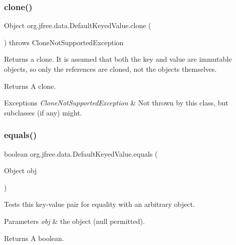 \subsubsection{\texorpdfstring{clone()}{clone()}}
{\footnotesize\ttfamily Object org.\+jfree.\+data.\+Default\+Keyed\+Value.\+clone (\begin{DoxyParamCaption}{ }\end{DoxyParamCaption}) throws Clone\+Not\+Supported\+Exception}

Returns a clone. It is assumed that both the key and value are immutable objects, so only the references are cloned, not the objects themselves.

\begin{DoxyReturn}{Returns}
A clone.
\end{DoxyReturn}

\begin{DoxyExceptions}{Exceptions}
{\em Clone\+Not\+Supported\+Exception} & Not thrown by this class, but subclasses (if any) might. \\
\hline
\end{DoxyExceptions}
\mbox{\label{classorg_1_1jfree_1_1data_1_1_default_keyed_value_a880ac178b54b7bd6b083d303c063e7cb}} 
\subsubsection{\texorpdfstring{equals()}{equals()}}
{\footnotesize\ttfamily boolean org.\+jfree.\+data.\+Default\+Keyed\+Value.\+equals (\begin{DoxyParamCaption}\item[{Object}]{obj }\end{DoxyParamCaption})}

Tests this key-\/value pair for equality with an arbitrary object.


\begin{DoxyParams}{Parameters}
{\em obj} & the object ({\ttfamily null} permitted).\\
\hline
\end{DoxyParams}
\begin{DoxyReturn}{Returns}
A boolean. 
\end{DoxyReturn}
\mbox{\label{classorg_1_1jfree_1_1data_1_1_default_keyed_value_a5f0bfcf7b9c134922523b70e19bb69ee}} 
